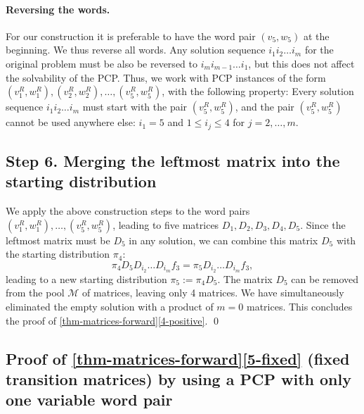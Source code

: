 \documentclass[a4paper,cleveref, autoref, thm-restate]{lipics-v2021}
\begin{document}
\paragraph{Reversing the words.}
For our construction it is preferable to have the
word pair
$(v_5,w_5)$ at the beginning. We thus reverse all words.
Any solution sequence
$i_1i_2\ldots i_m$ for the original problem
must be also be reversed to
$i_mi_{m-1}\ldots i_1$, but this does not affect
the solvability of the PCP.
Thus, we work with PCP instances of the form
 $(v_1^R,w_1^R),
\allowbreak
(v_2^R,w_2^R), \ldots,
(v_5^R,w_5^R)$, with the following property:
Every
 solution sequence
 $i_1i_2\ldots i_m$
 must start with the pair
$(v_5^R,w_5^R)$,
and the pair
 $(v_5^R,w_5^R)$ cannot be used anywhere else:
 $i_1=5$ and $1\le i_j\le 4$ for $j=2,\ldots,m$.

\subsection{Step 6. Merging the leftmost matrix into the starting distribution} 
\label{sec:step6}
\label{sec:merge-left}
We apply the above construction steps to the word pairs $(v_1^R,w_1^R),
\allowbreak
\ldots,
(v_5^R,w_5^R)$, leading to five matrices $D_1,D_2,D_3,D_4,D_5$.
Since the leftmost matrix must be $D_5$ in any solution,
we can combine this %
matrix $D_5$ with the starting
distribution $\pi_4$: 
\begin{equation}
  \nonumber %
  \pi_4D_{5}D_{i_2} \ldots D_{i_m}f_3 =
  \pi_5D_{i_2} \ldots D_{i_m}f_3 ,
\end{equation}
leading to a new starting distribution
$  \pi_5 :=
\pi_4D_{5}$.
The matrix $D_5$ can be removed from the pool $\mathcal{M}$ of
matrices,
leaving only 4 matrices.
We have simultaneously eliminated the empty solution with a product of
$m=0$ matrices.
This concludes the proof of
\autoref{thm-matrices-forward}\ref{4-positive}.
\qed

\subsection{Proof of \autoref{thm-matrices-forward}\ref{5-fixed} (fixed
  transition matrices) by using a PCP with only one variable word pair}
\label{sec:Mati}
\end{document}
